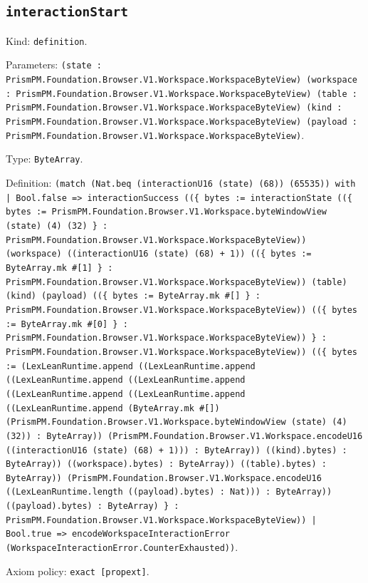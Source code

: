 \documentclass[11pt]{article}
\begin{document}
\subsection*{\texttt{interactionStart}}
\noindent Kind: \texttt{definition}.\par
\noindent Parameters: \texttt{(state : PrismPM.Foundation.Browser.V1.Workspace.WorkspaceByteView) (workspace : PrismPM.Foundation.Browser.V1.Workspace.WorkspaceByteView) (table : PrismPM.Foundation.Browser.V1.Workspace.WorkspaceByteView) (kind : PrismPM.Foundation.Browser.V1.Workspace.WorkspaceByteView) (payload : PrismPM.Foundation.Browser.V1.Workspace.WorkspaceByteView)}.\par
\noindent Type: \texttt{ByteArray}.\par
\noindent Definition: \texttt{(match (Nat.beq (interactionU16 (state) (68)) (65535)) with | Bool.false => interactionSuccess ((\{ bytes := interactionState ((\{ bytes := PrismPM.Foundation.Browser.V1.Workspace.byteWindowView (state) (4) (32) \} : PrismPM.Foundation.Browser.V1.Workspace.WorkspaceByteView)) (workspace) ((interactionU16 (state) (68) + 1)) ((\{ bytes := ByteArray.mk \#[1] \} : PrismPM.Foundation.Browser.V1.Workspace.WorkspaceByteView)) (table) (kind) (payload) ((\{ bytes := ByteArray.mk \#[] \} : PrismPM.Foundation.Browser.V1.Workspace.WorkspaceByteView)) ((\{ bytes := ByteArray.mk \#[0] \} : PrismPM.Foundation.Browser.V1.Workspace.WorkspaceByteView)) \} : PrismPM.Foundation.Browser.V1.Workspace.WorkspaceByteView)) ((\{ bytes := (LexLeanRuntime.append ((LexLeanRuntime.append ((LexLeanRuntime.append ((LexLeanRuntime.append ((LexLeanRuntime.append ((LexLeanRuntime.append ((LexLeanRuntime.append (ByteArray.mk \#[]) (PrismPM.Foundation.Browser.V1.Workspace.byteWindowView (state) (4) (32)) : ByteArray)) (PrismPM.Foundation.Browser.V1.Workspace.encodeU16 ((interactionU16 (state) (68) + 1))) : ByteArray)) ((kind).bytes) : ByteArray)) ((workspace).bytes) : ByteArray)) ((table).bytes) : ByteArray)) (PrismPM.Foundation.Browser.V1.Workspace.encodeU16 ((LexLeanRuntime.length ((payload).bytes) : Nat))) : ByteArray)) ((payload).bytes) : ByteArray) \} : PrismPM.Foundation.Browser.V1.Workspace.WorkspaceByteView)) | Bool.true => encodeWorkspaceInteractionError (WorkspaceInteractionError.CounterExhausted))}.\par
\noindent Axiom policy: \texttt{exact [propext]}.\par
\end{document}
